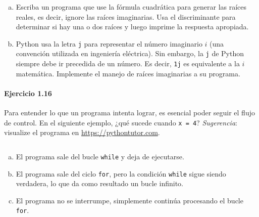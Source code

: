 \begin{enumerate}[(a)]
	\item

	      Escriba un programa que use la fórmula cuadrática para
	      generar las raíces reales, es decir, ignore las raíces
	      imaginarias.
	      Usa el discriminante para determinar si hay una o dos
	      raíces y luego imprime la respuesta apropiada.

	\item

	      Python usa la letra \texttt{j} para representar
	      el número imaginario $i$ (una convención utilizada en
	      ingeniería eléctrica).
	      Sin embargo, la \texttt{j} de Python siempre debe
	      ir precedida de un número.
	      Es decir, \texttt{1j} es equivalente a la $i$
	      matemática.
	      Implemente el manejo de raíces imaginarias a su programa.
\end{enumerate}

\paragraph{\color{DarkBlue}Ejercicio 1.16}
Para entender lo que un programa intenta lograr, es esencial poder
seguir el flujo de control.
En el siguiente ejemplo, ¿qué sucede cuando
\texttt{x = 4}?
\emph{Sugerencia}: visualize el programa en
\url{https://pythontutor.com}.

\begin{listing}[ht!]
	\inputminted{python}{1.16.py}
\end{listing}

\begin{enumerate}[(a)]
	\item

	      El programa sale del bucle \texttt{while} y deja
	      de ejecutarse.

	\item

	      El programa sale del ciclo \texttt{for}, pero la
	      condición \texttt{while} sigue siendo verdadera,
	      lo que da como resultado un bucle infinito.

	\item

	      El programa no se interrumpe, simplemente continúa procesando
	      el bucle \texttt{for}.
\end{enumerate}


